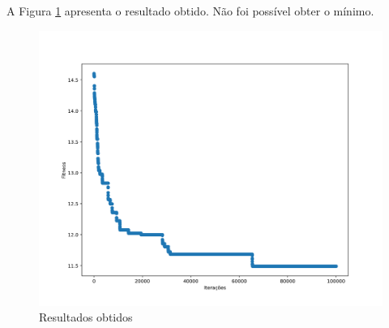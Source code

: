 \documentclass[12pt]{article}
\begin{document}
	A Figura \ref{fig_rodando1281} apresenta o resultado obtido. Não foi possível obter o mínimo. 
	
	\begin{figure}[h!]
		\centering
		\includegraphics[width=0.7\linewidth]{../rodando128_1}
		\caption{Resultados obtidos}
		\label{fig_rodando1281}
	\end{figure}
	
\end{document}

